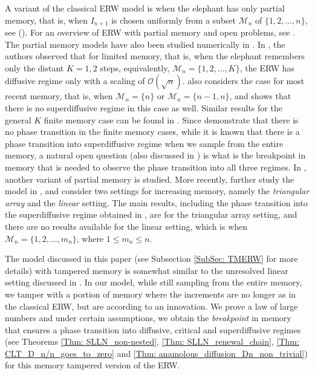 \documentclass{article}
\numberwithin{equation}{section}
\newcommand{\OO}{\mbox{${\mathcal O}$}}
\newcommand{\1}{\mathbf{1}}
\newcommand{\0}{\mathbf{0}}
\begin{document}
A variant of the classical ERW model is when the elephant has only partial memory, that is, when $I_{n+1}$ is chosen uniformly from a subset $\mathcal{M}_n$ of $\{1,2,\ldots, n\}$, see (\cite{Gu_St_2021, Gu_St_2022, gut2023elephant}). For an overview of ERW with partial memory and open problems, see \cite{gut2023elephant}. The partial memory models have also been studied numerically in \cite{Cr_da_Si_2007, daSilva_Cr_Vi_2005}.
In \cite{Gu_St_2021}, the authors observed that for limited memory, that is, when the elephant remembers only the distant $K=1,2$ steps, equivalently, $\mathcal{M}_n = \{1, 2, \ldots, K\}$, the ERW has diffusive regime only with a scaling of $\OO(\sqrt{n})$. \cite{Gu_St_2021} also considers the case for most recent memory, that is, when $\mathcal{M}_n= \{n \}$ or $\mathcal{M}_n= \{n-1, n\}$, and shows that there is no superdiffusive regime in this case as well. Similar results for the general $K$ finite memory case can be found in \cite{ben2021finite}. Since \cite{Gu_St_2021,ben2021finite} demonstrate that there is no phase transition in the finite memory cases, while it is known that there is a phase transition into superdiffusive regime when we sample from the entire memory, a natural open question (also discussed in \cite{Gu_St_2021}) is what is the breakpoint in memory that is needed to observe the phase transition into all three regimes. In \cite{Gu_St_2022}, another variant of partial memory is studied.
More recently, \cite{Ro_Ta_Ta_2025} further study the model in \cite{Gu_St_2022}, and consider two settings for increasing memory, namely the \textit{triangular array} and the \textit{linear} setting. The main results, including the phase transition into the superdiffusive regime obtained in \cite{Ro_Ta_Ta_2025}, are for the triangular array setting, and there are no results available for the linear setting, which is when $\mathcal{M}_n = \{1,2,\ldots, m_n\}$, where $ 1 \le m_n \le n$.


The model discussed in this paper (see Subsection \ref{SubSec: TMERW} for more details) with tampered memory is somewhat similar to the unresolved linear setting discussed in \cite{Ro_Ta_Ta_2025}. In our model, while still sampling from the entire memory, we tamper with a portion of memory where the increments are no longer as in the classical ERW, but are according to an innovation. We prove a law of large numbers and under certain assumptions, we obtain the \textit{breakpoint} in memory that ensures a phase transition into diffusive, critical and superdiffusive regimes (see Theorems \ref{Thm: SLLN_non-nested}, \ref{Thm: SLLN_renewal_chain}, \ref{Thm: CLT_D_n/n_goes_to_zero} and \ref{Thm: anamolous_diffusion_Dn_non_trivial}) for this memory tampered version of the ERW.  
\end{document}
